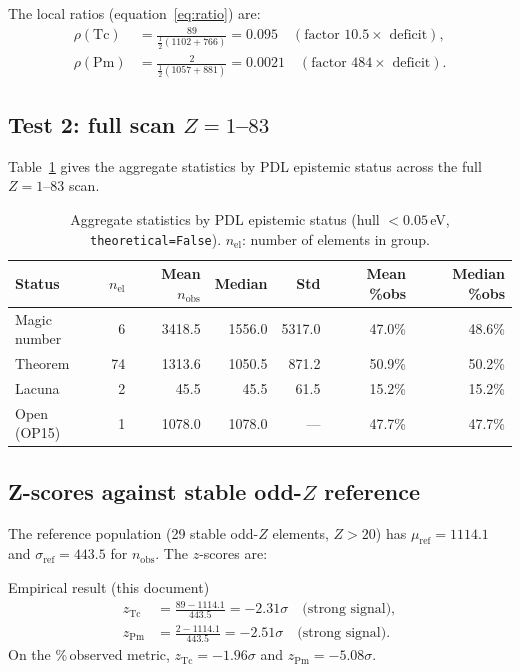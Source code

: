 \documentclass[11pt,a4paper]{article}
\theoremstyle{definition}
\theoremstyle{remark}
\begin{document}
\noindent The local ratios (equation~\ref{eq:ratio}) are:
\begin{align}
  \rho(\mathrm{Tc}) &= \frac{89}{\tfrac{1}{2}(1102+766)} = 0.095 \quad (\text{factor } 10.5\times \text{ deficit}), \label{eq:ratio_tc} \\
  \rho(\mathrm{Pm}) &= \frac{2}{\tfrac{1}{2}(1057+881)} = 0.0021 \quad (\text{factor } 484\times \text{ deficit}). \label{eq:ratio_pm}
\end{align}

\subsection{Test 2: full scan \texorpdfstring{$Z=1$--$83$}{Z=1--83}}

Table~\ref{tab:summary} gives the aggregate statistics by PDL epistemic status across the full $Z=1$--$83$ scan.

\begin{table}[ht]
\centering
\caption{Aggregate statistics by PDL epistemic status (hull $<0.05$\,eV, \texttt{theoretical=False}). $n_{\mathrm{el}}$: number of elements in group.}
\label{tab:summary}
\renewcommand{\arraystretch}{1.25}
\begin{tabular}{lrrrrrr}
\toprule
Status & $n_{\mathrm{el}}$ & Mean $n_{\mathrm{obs}}$ & Median & Std & Mean \%obs & Median \%obs \\
\midrule
Magic number   & 6  & 3418.5 & 1556.0 & 5317.0 & 47.0\% & 48.6\% \\
Theorem        & 74 & 1313.6 & 1050.5 &  871.2 & 50.9\% & 50.2\% \\
\rowcolor{lccolor}
Lacuna         & 2  &   45.5 &   45.5 &   61.5 & 15.2\% & 15.2\% \\
Open (OP15)    & 1  & 1078.0 & 1078.0 &    --- & 47.7\% & 47.7\% \\
\bottomrule
\end{tabular}
\end{table}

\subsection{Z-scores against stable odd-\texorpdfstring{$Z$}{Z} reference}

The reference population (29 stable odd-$Z$ elements, $Z>20$) has $\mu_{\mathrm{ref}} = 1114.1$ and $\sigma_{\mathrm{ref}} = 443.5$ for $n_{\mathrm{obs}}$. The $z$-scores are:

\begin{pdlresult}{Empirical result (this document)}
\begin{align}
  z_{\mathrm{Tc}} &= \frac{89 - 1114.1}{443.5} = -2.31\sigma \quad \text{(strong signal)}, \label{eq:z_tc} \\[4pt]
  z_{\mathrm{Pm}} &= \frac{2 - 1114.1}{443.5} = -2.51\sigma \quad \text{(strong signal)}. \label{eq:z_pm}
\end{align}
On the \%\,observed metric, $z_{\mathrm{Tc}} = -1.96\sigma$ and $z_{\mathrm{Pm}} = -5.08\sigma$.
\end{pdlresult}
\end{document}
